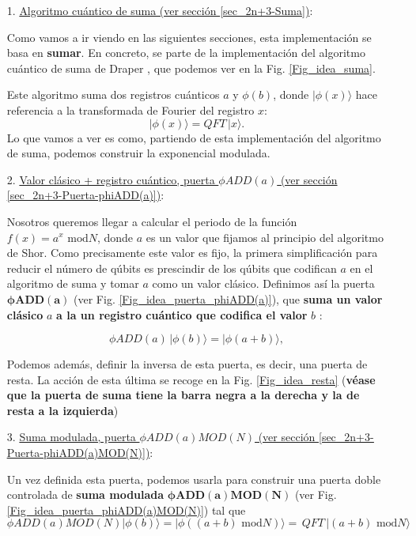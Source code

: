\documentclass[a4paper,11pt]{book} %
\numberwithin{equation}{chapter}
\begin{document}
\begin{itemize}

	\item[1.] \underline{Algoritmo cuántico de suma (ver sección \ref{sec_2n+3-Suma})}: 
	
	Como vamos a ir viendo en las siguientes secciones, esta implementación se basa en \textbf{sumar}. En concreto, se parte de la implementación del algoritmo cuántico de suma de Draper \cite{bib_Addition}, que podemos ver en la Fig. \ref{Fig_idea_suma}.


Este algoritmo suma dos registros cuánticos $a$ y $\phi (b)$, donde $| \phi(x) \rangle$ hace referencia a la transformada de Fourier del registro $x$:
	\begin{equation}
	\boxed{|\phi (x) \rangle = QFT \, |x \rangle.}
	\end{equation}
Lo que vamos a ver es como, partiendo de esta implementación del algoritmo de suma, podemos construir la exponencial modulada.



	\item[2.] \underline{Valor clásico + registro cuántico, puerta $\phi ADD(a)$ (ver sección \ref{sec_2n+3-Puerta-phiADD(a)})}: 
	 
	Nosotros queremos llegar a calcular el periodo de la función $f(x) = a^x \text{ mod}N$, donde $a$ es un valor que fijamos al principio del algoritmo de Shor. Como precisamente este valor es fijo, la primera simplificación para reducir el número de qúbits es prescindir de los qúbits que codifican $a$ en el algoritmo de suma y tomar $a$ como un valor clásico. Definimos así la puerta $\bm{\phi ADD(a)}$ (ver Fig. \ref{Fig_idea_puerta_phiADD(a)}), que \textbf{suma un valor clásico} $a$ \textbf{a la un registro cuántico que codifica el valor} $b$ :
	
\begin{equation}
\boxed{\phi ADD(a) \, |\phi (b) \rangle = |\phi (a+b) \rangle},
\end{equation}

Podemos además, definir la inversa de esta puerta, es decir, una puerta de resta. La acción de esta última se recoge en la Fig. \ref{Fig_idea_resta} (\textbf{véase que la puerta de suma tiene la barra negra a la derecha y la de resta a la izquierda})


	\item[3.] \underline{Suma modulada, puerta ${\phi ADD(a)MOD(N)}$ (ver sección \ref{sec_2n+3-Puerta-phiADD(a)MOD(N)})}: 
	
	Un vez definida esta puerta, podemos usarla para construir una puerta doble controlada de \textbf{suma modulada} $\bm{\phi ADD(a)MOD(N)}$ (ver Fig. \ref{Fig_idea_puerta_phiADD(a)MOD(N)}) tal que 
	\begin{equation}
	\boxed{\phi ADD(a)MOD(N) |\phi (b) \rangle = |\phi \left( (a+b) \text{ mod} N \right)\rangle } = \,  QFT \, | (a+b) \text{ mod} N \rangle
	\end{equation}



\end{itemize}
\end{document}
